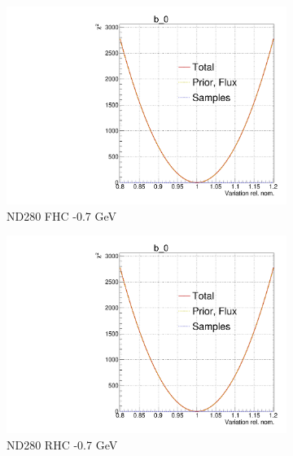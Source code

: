\begin{figure}[h]
\begin{subfigure}[t]{0.32\textwidth}
	\includegraphics[width=\textwidth, trim={0mm 0mm 0mm 11mm}, clip,page=18]{figures/mach3/Asimov/Full_LLHscan_18July_BeRPA_U_ND280logL_scan}
	\caption{ND280 FHC -0.7 GeV}
\end{subfigure}
\begin{subfigure}[t]{0.32\textwidth}
	\includegraphics[width=\textwidth, trim={0mm 0mm 0mm 11mm}, clip,page=45]{figures/mach3/Asimov/Full_LLHscan_18July_BeRPA_U_ND280logL_scan}
	\caption{ND280 RHC -0.7 GeV}
\end{subfigure}
\begin{subfigure}[t]{0.32\textwidth}

\end{subfigure}
\end{figure}
